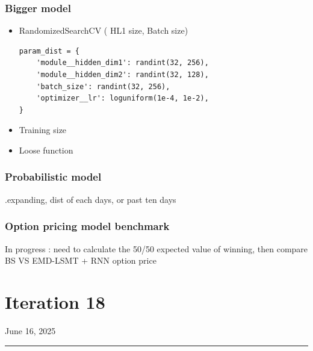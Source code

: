 \documentclass[letterpaper,11pt]{article}
\begin{document}
\subsubsection*{Bigger model}
\begin{itemize}

  \item RandomizedSearchCV ( HL1 size, Batch size)
  
\begin{verbatim}
param_dist = {
    'module__hidden_dim1': randint(32, 256),
    'module__hidden_dim2': randint(32, 128),
    'batch_size': randint(32, 256),
    'optimizer__lr': loguniform(1e-4, 1e-2),
}
\end{verbatim}
  \item Training size
  \item Loose function

\end{itemize}

\bigskip
\subsubsection*{Probabilistic model}
.expanding, dist of each days, or past ten days


\bigskip
\subsubsection*{Option pricing model benchmark}
In progress : need to calculate the 50/50 expected value of winning, then compare BS VS EMD-LSMT + RNN option price











\newpage
\section*{Iteration 18}
\begin{flushright}
June 16, 2025
\end{flushright}
\hrule
\vspace{0.2in}
\end{document}
